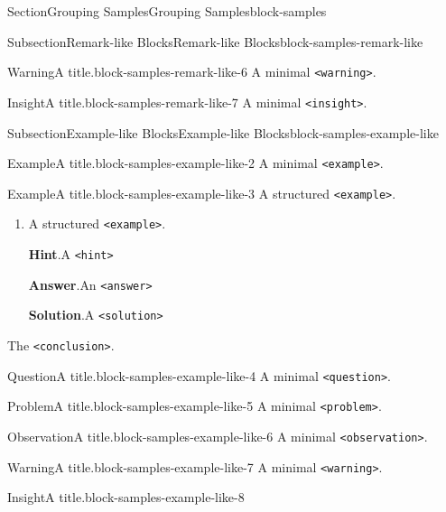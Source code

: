 \documentclass[twoside,10pt,]{article}
\newcommand{\blocktitlefont}{\relax}
\newcommand{\mono}[1]{\texttt{#1}}
\numberwithin{equation}{section}
\begin{document}
\begin{sectionptx}{Section}{Grouping Samples}{}{Grouping Samples}{}{}{block-samples}
\begin{subsectionptx}{Subsection}{Remark-like Blocks}{}{Remark-like Blocks}{}{}{block-samples-remark-like}
\begin{warning}{Warning}{A title.}{block-samples-remark-like-6}
A minimal \mono{<warning>}.%
\end{warning}
\begin{insight}{Insight}{A title.}{block-samples-remark-like-7}%
A minimal \mono{<insight>}.%
\end{insight}
\end{subsectionptx}
%
%
\typeout{************************************************}
\typeout{************************************************}
%
\begin{subsectionptx}{Subsection}{Example-like Blocks}{}{Example-like Blocks}{}{}{block-samples-example-like}
\begin{example}{Example}{A title.}{block-samples-example-like-2}%
A minimal \mono{<example>}.%
\end{example}
\begin{example}{Example}{A title.}{block-samples-example-like-3}%
A structured \mono{<example>}.%
\begin{enumerate}[font=\bfseries,label=(\alph*),ref=\alph*]%
\item{}A structured \mono{<example>}.%
\par\smallskip%
\noindent\textbf{\blocktitlefont Hint}.\hypertarget{block-samples-example-like-3-3-2}{}\quad{}A \mono{<hint>}%
\par\smallskip%
\noindent\textbf{\blocktitlefont Answer}.\hypertarget{block-samples-example-like-3-3-3}{}\quad{}An \mono{<answer>}%
\par\smallskip%
\noindent\textbf{\blocktitlefont Solution}.\hypertarget{block-samples-example-like-3-3-4}{}\quad{}A \mono{<solution>}%
\end{enumerate}%
The \mono{<conclusion>}.%
\end{example}
\begin{question}{Question}{A title.}{block-samples-example-like-4}%
A minimal \mono{<question>}.%
\end{question}
\begin{problem}{Problem}{A title.}{block-samples-example-like-5}%
A minimal \mono{<problem>}.%
\end{problem}
\begin{observation}{Observation}{A title.}{block-samples-example-like-6}%
A minimal \mono{<observation>}.%
\end{observation}
\begin{warning}{Warning}{A title.}{block-samples-example-like-7}%
A minimal \mono{<warning>}.%
\end{warning}
\begin{insight}{Insight}{A title.}{block-samples-example-like-8}%

\end{insight}
\end{subsectionptx}
\end{sectionptx}
\end{document}
